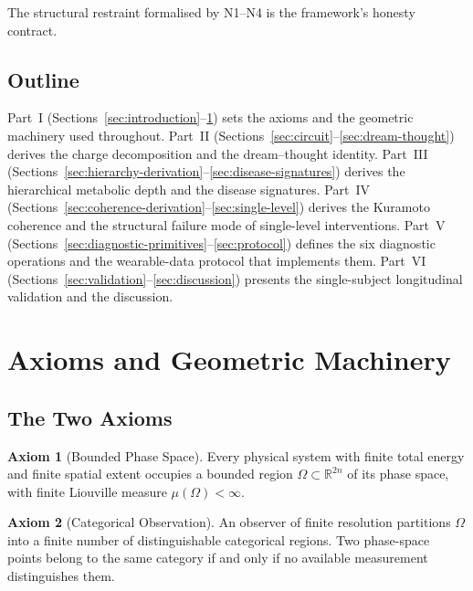 \documentclass[11pt,twocolumn,a4paper]{article}
\theoremstyle{definition}
\newtheorem{axiom}{Axiom}
\theoremstyle{remark}
\newcommand{\Real}{\mathbb{R}}
\begin{document}
The structural restraint formalised by N1--N4 is the framework's
honesty contract.

\subsection{Outline}

Part~I (Sections~\ref{sec:introduction}--\ref{sec:axioms}) sets the
axioms and the geometric machinery used throughout. Part~II
(Sections~\ref{sec:circuit}--\ref{sec:dream-thought}) derives the
charge decomposition and the dream--thought identity. Part~III
(Sections~\ref{sec:hierarchy-derivation}--\ref{sec:disease-signatures})
derives the hierarchical metabolic depth and the disease signatures.
Part~IV (Sections~\ref{sec:coherence-derivation}--\ref{sec:single-level})
derives the Kuramoto coherence and the structural failure mode of
single-level interventions. Part~V
(Sections~\ref{sec:diagnostic-primitives}--\ref{sec:protocol}) defines
the six diagnostic operations and the wearable-data protocol that
implements them. Part~VI
(Sections~\ref{sec:validation}--\ref{sec:discussion}) presents the
single-subject longitudinal validation and the discussion.

\section{Axioms and Geometric Machinery}
\label{sec:axioms}

\subsection{The Two Axioms}

\begin{axiom}[Bounded Phase Space]
\label{ax:bps}
Every physical system with finite total energy and finite spatial
extent occupies a bounded region $\Omega \subset \Real^{2n}$ of its
phase space, with finite Liouville measure $\mu(\Omega) < \infty$.
\end{axiom}

\begin{axiom}[Categorical Observation]
\label{ax:cat}
An observer of finite resolution partitions $\Omega$ into a finite
number of distinguishable categorical regions. Two phase-space points
belong to the same category if and only if no available measurement
distinguishes them.
\end{axiom}
\end{document}
